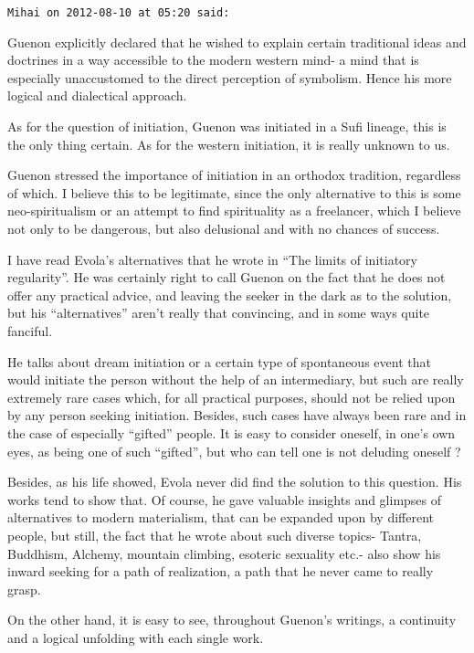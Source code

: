 \begin{footnotesize}
\begin{sffamily}
\hfill

\texttt{Mihai on 2012-08-10 at 05:20 said:}

Guenon explicitly declared that he wished to explain certain traditional ideas and doctrines in a way accessible to the modern western mind- a mind that is especially unaccustomed to the direct perception of symbolism. Hence his more logical and dialectical approach.

As for the question of initiation, Guenon was initiated in a Sufi lineage, this is the only thing certain. As for the western initiation, it is really unknown to us.

Guenon stressed the importance of initiation in an orthodox tradition, regardless of which. I believe this to be legitimate, since the only alternative to this is some neo-spiritualism or an attempt to find spirituality as a freelancer, which I believe not only to be dangerous, but also delusional and with no chances of success.

I have read Evola's alternatives that he wrote in ``The limits of initiatory regularity''. He was certainly right to call Guenon on the fact that he does not offer any practical advice, and leaving the seeker in the dark as to the solution, but his ``alternatives'' aren't really that convincing, and in some ways quite fanciful.

He talks about dream initiation or a certain type of spontaneous event that would initiate the person without the help of an intermediary, but such are really extremely rare cases which, for all practical purposes, should not be relied upon by any person seeking initiation. Besides, such cases have always been rare and in the case of especially ``gifted'' people. It is easy to consider oneself, in one's own eyes, as being one of such ``gifted'', but who can tell one is not deluding oneself ?

Besides, as his life showed, Evola never did find the solution to this question. His works tend to show that. Of course, he gave valuable insights and glimpses of alternatives to modern materialism, that can be expanded upon by different people, but still, the fact that he wrote about such diverse topics- Tantra, Buddhism, Alchemy, mountain climbing, esoteric sexuality etc.- also show his inward seeking for a path of realization, a path that he never came to really grasp.

On the other hand, it is easy to see, throughout Guenon's writings, a continuity and a logical unfolding with each single work.


\end{sffamily}
\end{footnotesize}
